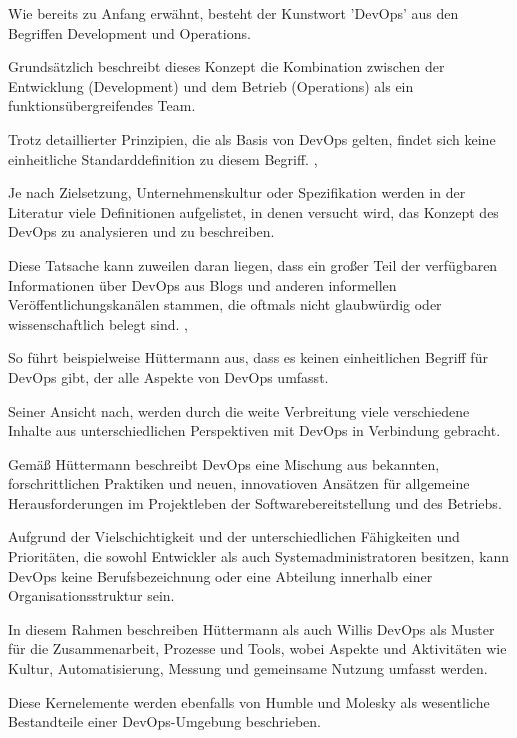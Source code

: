 Wie bereits zu Anfang erwähnt, besteht der Kunstwort 'DevOps' aus den Begriffen Development und Operations. 

Grundsätzlich beschreibt dieses Konzept die Kombination zwischen der Entwicklung (Development) und dem Betrieb (Operations) als ein funktionsübergreifendes Team. 

Trotz detaillierter Prinzipien, die als Basis von DevOps gelten, findet sich keine einheitliche Standarddefinition zu diesem Begriff. \cite{sollner_devops_2017},\cite{smeds_devops_2015}

Je nach Zielsetzung, Unternehmenskultur oder Spezifikation werden in der Literatur viele Definitionen aufgelistet, in denen versucht wird, das Konzept des DevOps zu analysieren und zu beschreiben.

Diese Tatsache kann zuweilen daran liegen, dass ein großer Teil der verfügbaren Informationen über DevOps aus Blogs und anderen informellen Veröffentlichungskanälen stammen, die oftmals nicht glaubwürdig oder wissenschaftlich belegt sind. \cite{smeds_devops_2015},\cite{roche_roche_2011}

So führt beispielweise Hüttermann\cite[S. 3,4]{huttermann_devops_2012} aus, dass es keinen einheitlichen Begriff für DevOps gibt, der alle Aspekte von DevOps umfasst. 

Seiner Ansicht nach, werden durch die weite Verbreitung viele verschiedene Inhalte aus unterschiedlichen Perspektiven mit DevOps in Verbindung gebracht.

Gemäß Hüttermann beschreibt DevOps eine Mischung aus bekannten, forschrittlichen Praktiken und neuen, innovatioven Ansätzen für allgemeine Herausforderungen im Projektleben der Softwarebereitstellung und des Betriebs. 

Aufgrund der Vielschichtigkeit und der unterschiedlichen Fähigkeiten und Prioritäten, die sowohl Entwickler als auch Systemadministratoren besitzen, kann DevOps keine Berufsbezeichnung oder eine Abteilung innerhalb einer Organisationsstruktur sein. \cite[S. 9]{huttermann_devops_2012} 

In diesem Rahmen beschreiben Hüttermann\cite[S. 3,4]{huttermann_devops_2012} als auch Willis\cite{willis_what_2010} DevOps als Muster für die Zusammenarbeit, Prozesse und Tools, wobei Aspekte und Aktivitäten wie Kultur, Automatisierung, Messung und gemeinsame Nutzung umfasst werden.

Diese Kernelemente werden ebenfalls von Humble und Molesky \cite{humble_why_2011} als wesentliche Bestandteile einer DevOps-Umgebung beschrieben. 

